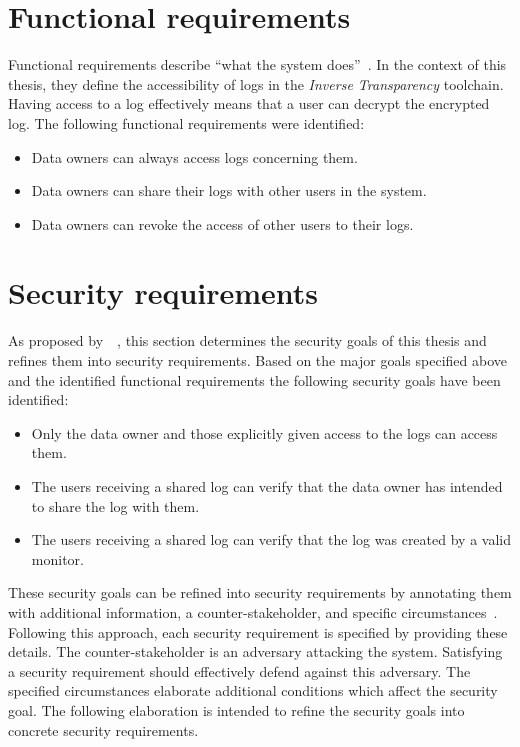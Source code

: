 \documentclass[../main.tex]{subfiles}
\begin{document}
\section{Functional requirements}\label{functional-requriements}
Functional requirements describe \enquote{what the system does}~\cite[11]{Mylopoulos1992}.
In the context of this thesis, they define the accessibility of logs in the \emph{Inverse Transparency} toolchain.
Having access to a log effectively means that a user can decrypt the encrypted log.
The following functional requirements were identified:
\begin{itemize}
    \item Data owners can always access logs concerning them.
    \item Data owners can share their logs with other users in the system.
    \item Data owners can revoke the access of other users to their logs.
\end{itemize}

\section{Security requirements}\label{security-requriements}
As proposed by~\citeauthor{Fabian2010}~\cite{Fabian2010}, this section determines the security goals of this thesis and refines them into security requirements.
Based on the major goals specified above and the identified functional requirements the following security goals have been identified:
\begin{itemize}
    \item Only the data owner and those explicitly given access to the logs can access them.
    \item The users receiving a shared log can verify that the data owner has intended to share the log with them.
    \item The users receiving a shared log can verify that the log was created by a valid monitor.
\end{itemize}

These security goals can be refined into security requirements by annotating them with additional information, a counter-stakeholder, and specific circumstances~\cite{Fabian2010}.
Following this approach, each security requirement is specified by providing these details.
The counter-stakeholder is an adversary attacking the system.
Satisfying a security requirement should effectively defend against this adversary.
The specified circumstances elaborate additional conditions which affect the security goal.
The following elaboration is intended to refine the security goals into concrete security requirements.
\end{document}
